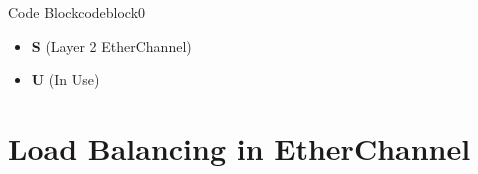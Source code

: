 \documentclass[a4paper]{article}
\begin{document}
\begin{enumerate}

	      \begin{ocg}{Code Block}{codeblock}{0}

		      \vspace{0.5cm}

		      \begin{tcolorbox}
			      \begin{itemize}
				      \item \textbf{S} (Layer 2 EtherChannel)
				      \item \textbf{U} (In Use)
			      \end{itemize}
		      \end{tcolorbox}
		      \vspace{0.5cm}
	      \end{ocg}
\end{enumerate}

\section{Load Balancing in EtherChannel}
\end{document}
